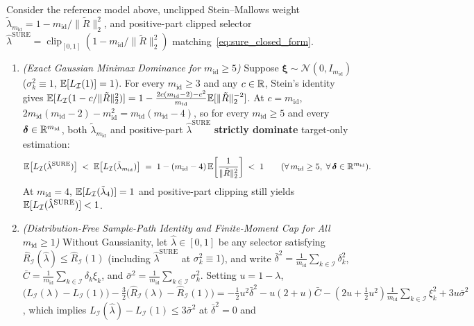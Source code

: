 \begin{theorem}\label{thm:sure_uniform}
Consider the reference model above, unclipped Stein--Mallows weight $\tilde{\lambda}_{m_{\mathrm{id}}} = 1 - m_{\mathrm{id}} / \|\tilde{R}\|_2^2$, and positive-part clipped selector $\hat{\lambda}^{\mathrm{SURE}} = \operatorname{clip}_{[0,1]}(1 - m_{\mathrm{id}} / \|\tilde{R}\|_2^2)$ matching~\eqref{eq:sure_closed_form}.
\begin{enumerate}
  \item \emph{(Exact Gaussian Minimax Dominance for $m_{\mathrm{id}} \ge 5$)} Suppose $\bm{\xi} \sim \mathcal{N}(0, I_{m_{\mathrm{id}}})$ ($\sigma_k^2 \equiv 1$, $\mathbb{E}[L_{\mathcal{I}}(1)] = 1$). For every $m_{\mathrm{id}} \ge 3$ and any $c \in \mathbb{R}$, Stein's identity gives $\mathbb{E}[L_{\mathcal{I}}(1 - c/\|\tilde{R}\|_2^2)] = 1 - \frac{2c(m_{\mathrm{id}}-2) - c^2}{m_{\mathrm{id}}}\mathbb{E}[\|\tilde{R}\|_2^{-2}]$. At $c = m_{\mathrm{id}}$, $2 m_{\mathrm{id}}(m_{\mathrm{id}} - 2) - m_{\mathrm{id}}^2 = m_{\mathrm{id}}(m_{\mathrm{id}} - 4)$, so for every $m_{\mathrm{id}} \ge 5$ and every $\bm{\delta} \in \mathbb{R}^{m_{\mathrm{id}}}$, both $\tilde{\lambda}_{m_{\mathrm{id}}}$ and positive-part $\hat{\lambda}^{\mathrm{SURE}}$ \textbf{strictly dominate} target-only estimation:
  \begin{equation}\label{eq:stein_dominance}
    \mathbb{E}\big[L_{\mathcal{I}}(\hat{\lambda}^{\mathrm{SURE}})\big]
    \;<\;
    \mathbb{E}\big[L_{\mathcal{I}}(\tilde{\lambda}_{m_{\mathrm{id}}})\big]
    \;=\;
    1 - (m_{\mathrm{id}} - 4)\,\mathbb{E}\!\left[\frac{1}{\|\tilde{R}\|_2^2}\right]
    \;<\; 1
    \qquad (\forall\, m_{\mathrm{id}} \ge 5,\; \forall\, \bm{\delta} \in \mathbb{R}^{m_{\mathrm{id}}}).
  \end{equation}
  At $m_{\mathrm{id}} = 4$, $\mathbb{E}[L_{\mathcal{I}}(\tilde{\lambda}_4)] = 1$ and positive-part clipping still yields $\mathbb{E}[L_{\mathcal{I}}(\hat{\lambda}^{\mathrm{SURE}})] < 1$.
  \item \emph{(Distribution-Free Sample-Path Identity and Finite-Moment Cap for All $m_{\mathrm{id}} \ge 1$)} Without Gaussianity, let $\hat{\lambda} \in [0, 1]$ be any selector satisfying $\widehat{R}_{\mathcal{I}}(\hat{\lambda}) \le \widehat{R}_{\mathcal{I}}(1)$ (including $\hat{\lambda}^{\mathrm{SURE}}$ at $\sigma_k^2 \equiv 1$), and write $\bar{\delta}^2 = \frac{1}{m_{\mathrm{id}}}\sum_{k \in \mathcal{I}} \delta_k^2$, $\bar{C} = \frac{1}{m_{\mathrm{id}}}\sum_{k \in \mathcal{I}} \delta_k \xi_k$, and $\bar{\sigma}^2 = \frac{1}{m_{\mathrm{id}}}\sum_{k \in \mathcal{I}} \sigma_k^2$. Setting $u = 1 - \lambda$, $\big(L_{\mathcal{I}}(\lambda) - L_{\mathcal{I}}(1)\big) - \frac{3}{2}\big(\widehat{R}_{\mathcal{I}}(\lambda) - \widehat{R}_{\mathcal{I}}(1)\big) = -\frac{1}{2}u^2 \bar{\delta}^2 - u(2 + u)\bar{C} - (2u + \frac{1}{2}u^2)\frac{1}{m_{\mathrm{id}}}\sum_{k \in \mathcal{I}} \xi_k^2 + 3u\bar{\sigma}^2$, which implies $L_{\mathcal{I}}(\hat{\lambda}) - L_{\mathcal{I}}(1) \le 3\bar{\sigma}^2$ at $\bar{\delta}^2 = 0$ and

\end{enumerate}
\end{theorem}

